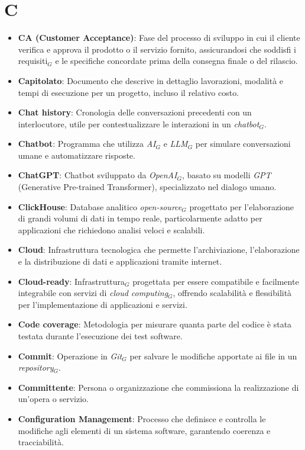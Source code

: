 \section{C}
\begin{itemize}
    \item \textbf{CA (Customer Acceptance)}: Fase del processo di sviluppo in cui il cliente verifica e approva il prodotto o il servizio fornito, assicurandosi che soddisfi i requisiti$_G$ e le specifiche concordate prima della consegna finale o del rilascio.
    \item \textbf{Capitolato}: Documento che descrive in dettaglio lavorazioni, modalità e tempi di esecuzione per un progetto, incluso il relativo costo.
    \item \textbf{Chat history}: Cronologia delle conversazioni precedenti con un interlocutore, utile per contestualizzare le interazioni in un \textit{chatbot}$_G$.
    \item \textbf{Chatbot}: Programma che utilizza \textit{AI}$_G$ e \textit{LLM}$_G$ per simulare conversazioni umane e automatizzare risposte.
    \item \textbf{ChatGPT}: Chatbot sviluppato da \textit{OpenAI}$_G$, basato su modelli \textit{GPT} (Generative Pre-trained Transformer), specializzato nel dialogo umano.
    \item \textbf{ClickHouse}: Database analitico \textit{open-source}$_G$ progettato per l'elaborazione di grandi volumi di dati in tempo reale, particolarmente adatto per applicazioni che richiedono analisi veloci e scalabili.
    \item \textbf{Cloud}: Infrastruttura tecnologica che permette l'archiviazione, l'elaborazione e la distribuzione di dati e applicazioni tramite internet.
    \item \textbf{Cloud-ready}: Infrastruttura$_G$ progettata per essere compatibile e facilmente integrabile con servizi di \textit{cloud computing}$_G$, offrendo scalabilità e flessibilità per l'implementazione di applicazioni e servizi.
    \item \textbf{Code coverage}: Metodologia per misurare quanta parte del codice è stata testata durante l'esecuzione dei test software.
    \item \textbf{Commit}: Operazione in \textit{Git}$_G$ per salvare le modifiche apportate ai file in un \textit{repository}$_G$.
    \item \textbf{Committente}: Persona o organizzazione che commissiona la realizzazione di un'opera o servizio.
    \item \textbf{Configuration Management}: Processo che definisce e controlla le modifiche agli elementi di un sistema software, garantendo coerenza e tracciabilità.

\end{itemize}
